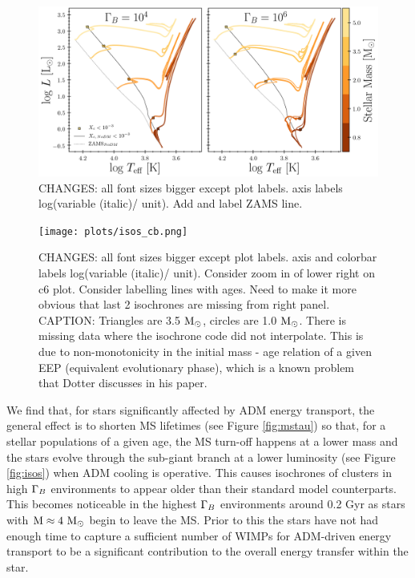 \documentclass[useAMS,usenatbib]{mnras}
\begin{document}
  \begin{figure}
    \centering
    \includegraphics[width=\textwidth]{plots/tracks.png}
    \caption{CHANGES: all font sizes bigger except plot labels. axis labels log(variable (italic)/ unit). Add and label ZAMS line.}
    \label{fig:tracks}
  \end{figure}

  \begin{figure}
    \centering
    \texttt{[image: plots/isos\_cb.png]}
    \caption{CHANGES: all font sizes bigger except plot labels. axis and colorbar labels log(variable (italic)/ unit). Consider zoom in of lower right on c6 plot. Consider labelling lines with ages. Need to make it more obvious that last 2 isochrones are missing from right panel.
    CAPTION: Triangles are 3.5$\ \mathrm{M}_{\odot}$, circles are 1.0$\ \mathrm{M}_{\odot}$. There is missing data where the isochrone code did not interpolate. This is due to non-monotonicity in the initial mass - age relation of a given EEP (equivalent evolutionary phase), which is a known problem that Dotter discusses in his paper.}
    \label{fig:isos_cb}
  \end{figure}


  We find that, for stars significantly affected by ADM energy transport, the general effect is to shorten MS lifetimes (see Figure \ref{fig:mstau}) so that, for a stellar populations of a given age, the MS turn-off happens at a lower mass and the stars evolve through the sub-giant branch at a lower luminosity (see Figure \ref{fig:isos}) when ADM cooling is operative. This causes isochrones of clusters in high $\Gamma_B$ environments to appear older than their standard model counterparts. This becomes noticeable in the highest $\Gamma_B$ environments around 0.2 Gyr as stars with $\rm{M} \approx 4 \ \mathrm{M}_{\odot}$ begin to leave the MS. Prior to this the stars have not had enough time to capture a sufficient number of WIMPs for ADM-driven energy transport to be a significant contribution to the overall energy transfer within the star.
\end{document}
